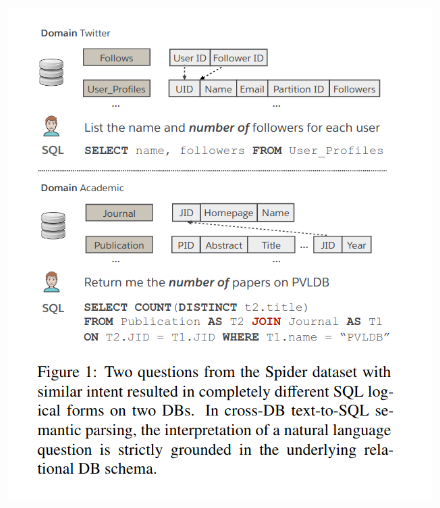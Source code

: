 \documentclass[10pt,a4paper]{article}
\begin{document}
\begin{figure}[htbp] 
\begin{center}
\includegraphics[scale=0.3]{./image/2.png}
\end{center}
\end{figure}  
\end{document}

